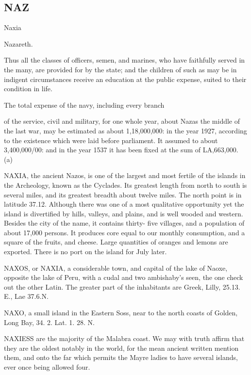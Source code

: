\subsection*{NAZ}
Naxia\par\medskip
Nazareth.\par\medskip
Thus all the classes of officers, semen, and marines, who have faithfully served in the many, are provided for by the state; and the children of such as may be in indigent circumstances receive an education at the public expense, suited to their condition in life.\par\medskip
The total expense of the navy, including every branch\par\medskip
of the service, civil and military, for one whole year, about Nazas the middle of the last war, may be estimated as about 1,18,000,000: in the year 1927, according to the existence which were laid before parliament. It assumed to about 3,400,000/00: and in the year 1537 it has been fixed at the sum of LA,663,000. (a)\par\medskip
NAXIA, the ancient Nazos, is one of the largest and most fertile of the islands in the Archeology, known as the Cyclades. Its greatest length from north to south is several miles, and its greatest breadth about twelve miles. The north point is in latitude 37.12. Although there was one of a most qualitative opportunity yet the island is divertified by hills, valleys, and plains, and is well wooded and western. Besides the city of the name, it contains thirty- five villages, and a population of about 17,000 persons. It produces core equal to our monthly consumption, and a square of the fruits, and cheese. Large quantities of oranges and lemons are exported. There is no port on the island for July later.\par\medskip
NAXOS, or NAXIA, a considerable town, and capital of the lake of Naoxe, opposite the lake of Peru, with a cudal and two ambishaby’s seen, the one check out the other Latin. The greater part of the inhabitants are Greek, Lilly, 25.13. E., Lae 37.6.N.\par\medskip
NAXO, a small island in the Eastern Soss, near to the north coasts of Golden, Long Bay, 34. 2. Lat. 1. 28. N.\par\medskip
NAXIESS are the majority of the Malabra coast. We may with truth affirm that they are the oldest notably in the world, for the mean ancient written mention them, and onto the far which permits the Mayre ladies to have several islands, ever once being allowed four.\par\medskip
